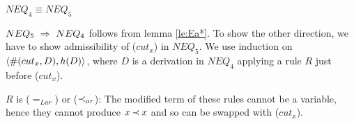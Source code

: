 \begin{LEMMA}\label{le:nocutx}
   $NEQ_4 \equiv NEQ_5$
\end{LEMMA}
\begin{PROOF}
   $NEQ_5\ \mathrel\Rightarrow\ NEQ_4$ follows from lemma
   \ref{le:Ea*}. To show the other direction, we have to show admissibility
   of ($cut_x$) in $NEQ_5$. We use induction on $\langle\#(cut_x,D),h(D)\rangle$, where
   $D$ is a derivation in $NEQ_4$ applying a rule $R$ just before ($cut_x$).
\begin{LS}
\item $R$ is ($=_{Lar}$) or ($\mathbin{\prec}_{ar}$): The modified term of these rules cannot be 
a variable, hence they cannot produce $x\mathbin{\prec} x$ and so can be swapped with ($cut_x$).
%
%
%

\end{LS}
\end{PROOF}
